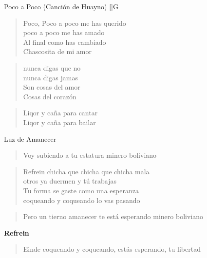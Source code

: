 \begin{song}[huayno]{Poco a Poco (Canción de Huayno)}
[]{G}
\begin{verse}{}
Poco, Poco a poco me has querido\\
poco a poco me has amado\\
Al final como has cambiado\\
Chascosita de mi amor
\end{verse}

\begin{verse}{}
nunca digas que no\\
nunca digas jamas\\
Son cosas del amor\\
Cosas del corazón
\end{verse}

\begin{verse}{}
Liqor y caña para cantar\\
Liqor y caña para bailar
\end{verse}
\end{song}

\begin{song}[huayno]{Luz de Amanecer}
\begin{verse}{}
Voy subiendo a tu estatura minero boliviano
\end{verse}

\begin{verse}{Refrein}
chicha que chicha que chicha mala\\
otros ya duermen y tú trabajas\\
Tu forma se gaste como una esperanza\\
coqueando y coqueando lo vas pasando
\end{verse}

\begin{verse}{}
Pero un tierno amanecer te está esperando minero boliviano
\end{verse}

\textbf{Refrein}

\begin{verse}{Einde}
coqueando y coqueando, estás esperando, tu libertad
\end{verse}
\end{song}